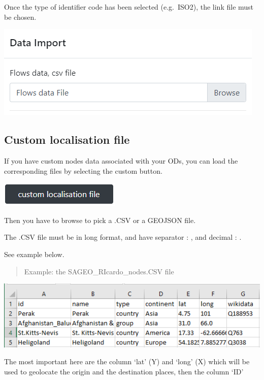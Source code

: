 \documentclass[
  letterpaper,
  DIV=11,
  numbers=noendperiod]{scrreprt}
\begin{document}
Once the type of identifier code has been selected (e.g.~ISO2), the link
file must be chosen.

\begin{center}
\includegraphics{images/Flow_import.PNG}
\end{center}

\subsection{Custom localisation file}\label{custom-localisation-file}

If you have custom nodes data associated with your ODs, you can load the
corresponding files by selecting the custom button.

\begin{center}
\includegraphics{images/Nodes_import_custom.PNG}
\end{center}

Then you have to browse to pick a .CSV or a GEOJSON file.

The .CSV file must be in long format, and have separator : , and decimal
: .

See example below.

\begin{quote}
Example: the SAGEO\_RIcardo\_nodes.CSV file
\end{quote}

\includegraphics{images/Example_RICarto_nodes.PNG}

The most important here are the column `lat' (Y) and `long' (X) which
will be used to geolocate the origin and the destination places, then
the column `ID'
\end{document}
